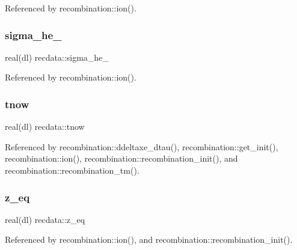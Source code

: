 Referenced by recombination\+::ion().

\mbox{\label{namespacerecdata_a5d432a7f8ed1a614dbc48413e8c4540a}} 
\subsubsection{\texorpdfstring{sigma\+\_\+he\+\_\+2pt}{sigma\_he\_2pt}}
{\footnotesize\ttfamily real(dl) recdata\+::sigma\+\_\+he\+\_\+2pt}



Referenced by recombination\+::ion().

\mbox{\label{namespacerecdata_ab35ca0eb7ecb1758876e6e979df99bb9}} 
\subsubsection{\texorpdfstring{tnow}{tnow}}
{\footnotesize\ttfamily real(dl) recdata\+::tnow}



Referenced by recombination\+::ddeltaxe\+\_\+dtau(), recombination\+::get\+\_\+init(), recombination\+::ion(), recombination\+::recombination\+\_\+init(), and recombination\+::recombination\+\_\+tm().

\mbox{\label{namespacerecdata_aba42d5992f637f77caa48a71505fc69d}} 
\subsubsection{\texorpdfstring{z\+\_\+eq}{z\_eq}}
{\footnotesize\ttfamily real(dl) recdata\+::z\+\_\+eq}



Referenced by recombination\+::ion(), and recombination\+::recombination\+\_\+init().

